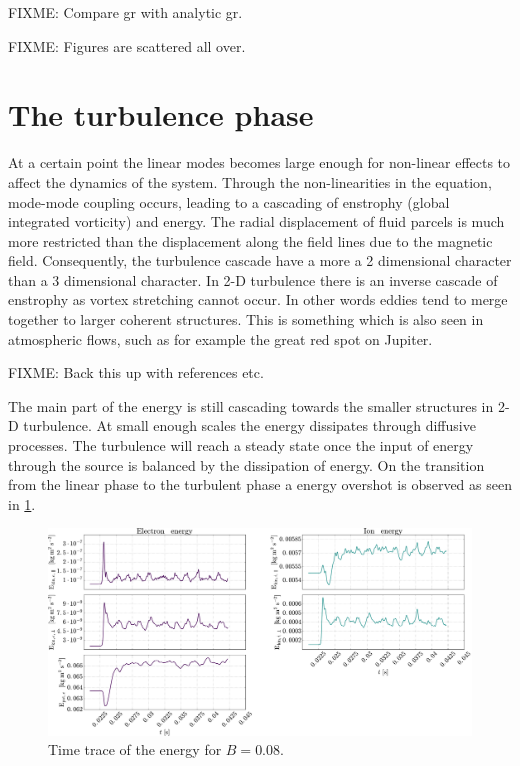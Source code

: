 FIXME: Compare gr with analytic gr.

FIXME: Figures are scattered all over.

\section{The turbulence phase}
%
At a certain point the linear modes becomes large enough for non-linear effects to affect the dynamics of the system.
Through the non-linearities in the equation, mode-mode coupling occurs, leading to a cascading of enstrophy (global integrated vorticity) and energy.
The radial displacement of fluid parcels is much more restricted than the displacement along the field lines due to the magnetic field.
Consequently, the turbulence cascade have a more a 2 dimensional character than a 3 dimensional character.
In 2-D turbulence there is an inverse cascade of enstrophy as vortex stretching cannot occur.
In other words eddies tend to merge together to larger coherent structures.
This is something which is also seen in atmospheric flows, such as for example the great red spot on Jupiter.

FIXME: Back this up with references etc.

The main part of the energy is still cascading towards the smaller structures in 2-D turbulence.
At small enough scales the energy dissipates through diffusive processes.
The turbulence will reach a steady state once the input of energy through the source is balanced by the dissipation of energy.
On the transition from the linear phase to the turbulent phase a energy overshot is observed as seen in \cref{fig:energyTrace008}.
%
\begin{figure}[htb]
    \centering
    \includegraphics[width=1.0\textwidth]{fig/results/energyTrace/energyTraceB008}
    \caption{Time trace of the energy for $B=0.08$.}
    \label{fig:energyTrace008}
\end{figure}

